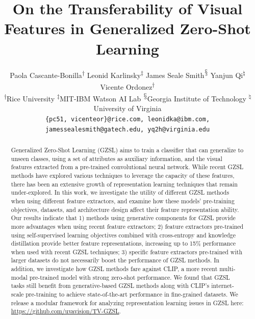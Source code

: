 \usepackage[capitalize]{cleveref}




\title{On the Transferability of Visual Features in Generalized Zero-Shot Learning}


\author{Paola Cascante-Bonilla\textsuperscript{$\dagger$} \quad Leonid Karlinsky\textsuperscript{$\ddagger$} \quad James Seale Smith\textsuperscript{$\mathsection$} \quad Yanjun Qi\textsuperscript{$\natural$} \quad Vicente Ordonez\textsuperscript{$\dagger$}\\
\textsuperscript{$\dagger$}Rice University \quad \textsuperscript{$\ddagger$}MIT-IBM Watson AI Lab \quad \textsuperscript{$\mathsection$}Georgia Institute of Technology \quad \textsuperscript{$\natural$}University of Virginia\\
{\tt\small \{pc51, vicenteor\}@rice.com, leonidka@ibm.com, jamessealesmith@gatech.edu, yq2h@virginia.edu}
}
\maketitle

\begin{abstract}


Generalized Zero-Shot Learning (GZSL) aims to train a classifier that can generalize to unseen classes, using a set of attributes as auxiliary information, and the visual features extracted from a pre-trained convolutional neural network.
While recent GZSL methods have explored various techniques to leverage the capacity of these features, there has been an extensive growth of representation learning techniques that remain under-explored. 
In this work, we investigate the utility of different GZSL methods when using different feature extractors, and examine how these models' pre-training objectives, datasets, and architecture design affect their feature representation ability.
Our results indicate that 1) methods using generative components for GZSL provide more advantages when using recent feature extractors;
2) feature extractors pre-trained using self-supervised learning objectives combined with cross-entropy and knowledge distillation provide better feature 
representations, increasing up to 15\% performance when used with recent GZSL techniques; 3) specific feature extractors pre-trained with larger datasets do not necessarily boost the performance of GZSL methods. 
In addition, we investigate how GZSL methods fare against CLIP, a more recent multi-modal pre-trained model with strong zero-shot performance. We found that GZSL tasks still benefit from generative-based GZSL methods along with CLIP's internet-scale pre-training to achieve state-of-the-art performance in fine-grained datasets.
We release a modular framework for analyzing representation learning issues in GZSL here: \href{https://github.com/uvavision/TV-GZSL}{https://github.com/uvavision/TV-GZSL}.

\end{abstract}


